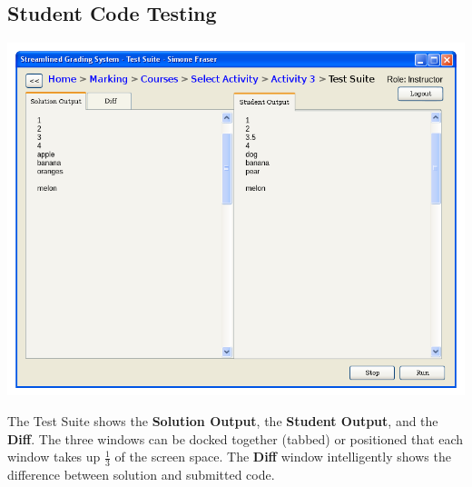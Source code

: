 \documentclass{article}
\begin{document}
\subsection{Student Code Testing}
\begin{center}
\includegraphics[scale=0.55]{../images/UIMockups/pngs/SRS_TestSuite_Split}
\label{testSuite}
\end{center}
The Test Suite shows the \textbf{Solution Output}, the \textbf{Student Output},
and the \textbf{Diff}.
The three windows can be docked together (tabbed) or positioned that each
window takes up $\frac{1}{3}$ of the screen space.
The \textbf{Diff} window intelligently shows the difference between
solution and submitted code.
\end{document}
